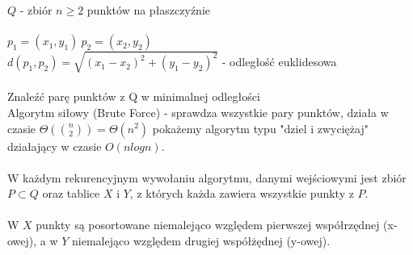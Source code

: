 $Q$ - zbiór $n\geq 2$ punktów na płaszczyźnie \\
\\
\tab $p_1= (x_1,y_1)\ p_2= (x_2,y_2)$ \\
\tab $d(p_1,p_2)= \sqrt{(x_1-x_2)^2+(y_1-y_2)^2}$ - odległość euklidesowa\\
\\
\tab Znaleźć parę punktów z Q w minimalnej odległości\\
Algorytm siłowy (Brute Force) - sprawdza wszystkie pary punktów, działa w czasie $\Theta(\binom{n}{2})=\Theta(n^2)$ pokażemy algorytm typu "dziel i zwyciężaj" działający w czasie $O(nlogn)$.\\
\\
W każdym rekurencyjnym wywołaniu algorytmu, danymi wejściowymi jest zbiór $P\subset Q$ oraz tablice $X$ i $Y$, z których każda zawiera wszystkie punkty z $P$.\\
\\
W $X$ punkty są posortowane niemalejąco względem pierwszej współrzędnej (x-owej), a w $Y$ niemalejąco względem drugiej współżędnej (y-owej).\\
\\
